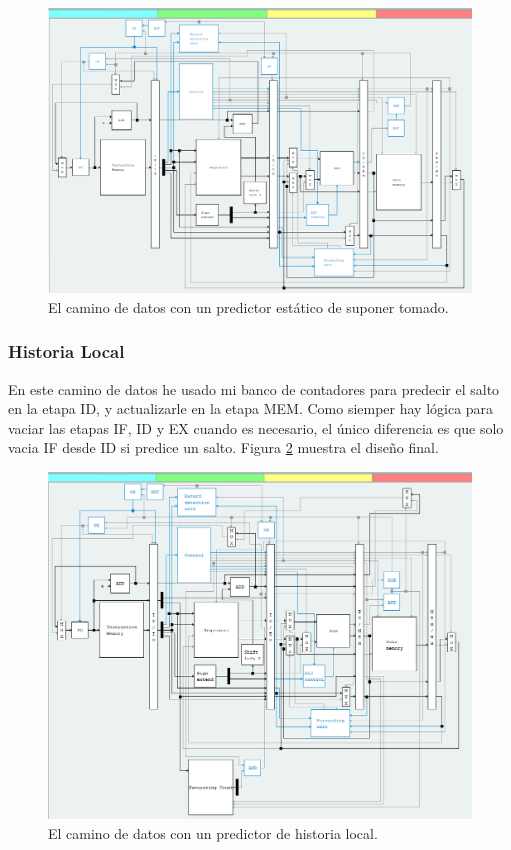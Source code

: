 \documentclass[a4paper]{article}
\begin{document}
\begin{figure}[!htb]
\centering
\includegraphics[scale=0.4]{./img/predict_taken_drmips}
\caption{El camino de datos con un predictor estático de suponer tomado.}
\label{fig:predict_taken_drmips}
\end{figure}

\subsubsection{Historia Local}

En este camino de datos he usado mi banco de contadores para predecir el salto en la etapa ID, y actualizarle en la etapa MEM. Como siemper hay lógica para vaciar las etapas IF, ID y EX cuando es necesario, el único diferencia es que solo vacia IF desde ID si predice un salto. Figura \ref{fig:local_history_drmips} muestra el diseño final.

\begin{figure}[!htb]
\centering
\includegraphics[scale=0.4]{./img/local_history_drmips}
\caption{El camino de datos con un predictor de historia local.}
\label{fig:local_history_drmips}
\end{figure}
\end{document}
